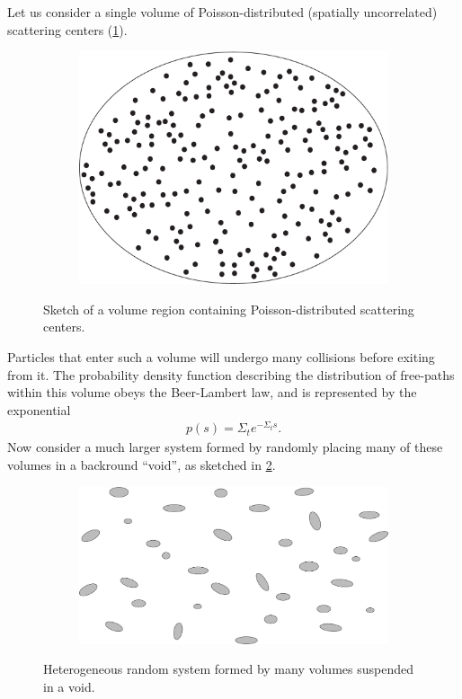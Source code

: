 \documentclass[12pt]{article}
\begin{document}
Let us consider a single volume of Poisson-distributed (spatially uncorrelated) scattering centers (\cref{fig1}).
\begin{figure}[hbt]
    \centering
    \begin{subfigure}{0.2\textwidth}
        \centering
        \includegraphics[width=\textwidth]{Fig1a}
    \end{subfigure}
 \caption{Sketch of a volume region containing Poisson-distributed scattering centers.}
    \label{fig1}
\end{figure}
Particles that enter such a volume will undergo many collisions before exiting from it. The probability density function describing the distribution of free-paths within this volume obeys the Beer-Lambert law, and is represented by the exponential
\begin{align}\label{eq1}
p(s) = \Sigma_t e^{-\Sigma_t s}.
\end{align}
Now consider a much larger system formed by randomly placing many of these volumes in a backround ``void'', as sketched in \cref{fig2}.
\begin{figure}[hbt]
    \centering
    \begin{subfigure}{0.3\textwidth}
        \centering
        \includegraphics[width=\textwidth]{Fig2a}
    \end{subfigure}
    \caption{Heterogeneous random system formed by many volumes suspended in a void.}
    \label{fig2}
\end{figure}
\end{document}
